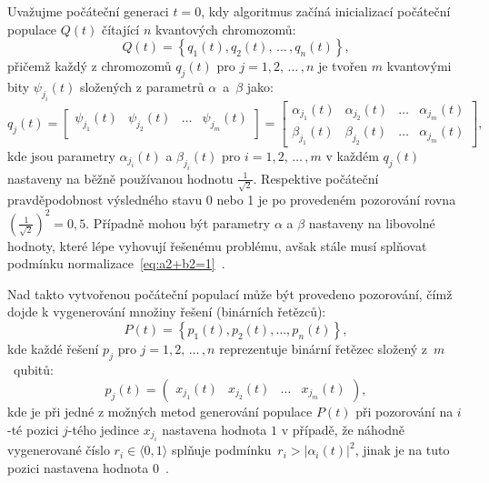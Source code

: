 Uvažujme počáteční generaci $t=0$, kdy algoritmus začíná inicializací počáteční populace $Q(t)$ čítající $n$ kvantových chromozomů:
\begin{equation}\label{eq:q(t)}
    Q(t) = \left\{ q_1(t), q_2(t),\,\dots\,, q_n(t) \right\},
\end{equation}
přičemž každý z chromozomů $q_j(t)$ pro $j = 1,2,\,\dots\,,n$ je tvořen $m$ kvantovými bity $\psi_{j_i}\left(t\right)$ složených z parametrů $\alpha$~a~$\beta$ jako:
\begin{equation*}
    q_j(t) =
    \begin{bmatrix}
        \psi_{j_1}\left(t\right) & \psi_{j_2}\left(t\right) & \dots & \psi_{j_m}\left(t\right) \\
    \end{bmatrix}
    =
    \begin{bmatrix}
        \alpha_{j_1}\left(t\right) & \alpha_{j_2}\left(t\right) & \dots & \alpha_{j_m}\left(t\right) \\
        \beta_{j_1}\left(t\right)  & \beta_{j_2}\left(t\right)  & \dots & \alpha_{j_m}\left(t\right)
    \end{bmatrix},
\end{equation*}
kde jsou parametry $\alpha_{j_i}(t)$ a $\beta_{j_i}(t)$ pro $i = 1,2,\,\dots\,,m$ v každém $q_j(t)$ nastaveny na běžně používanou hodnotu $\frac{1}{\sqrt{2}}$. 
Respektive počáteční pravděpodobnost výsledného stavu 0 nebo 1 je po provedeném pozorování rovna $\left(\frac{1}{\sqrt{2}}\right)^2 = 0,5$. 
Případně mohou být parametry $\alpha$ a $\beta$ nastaveny na libovolné hodnoty, které lépe vyhovují řešenému problému, avšak stále musí splňovat podmínku normalizace~\ref{eq:a2+b2=1}~\cite{NaturalComputing,qiga}. 

Nad takto vytvořenou počáteční populací může být provedeno pozorování, čímž dojde k vygenerování množiny řešení (binárních řetězců):
\begin{equation}\label{eq:p(t)}
    P(t) = \left\{ p_1(t), p_2(t), \dots, p_n(t) \right\},
\end{equation}
kde každé řešení $p_j$ pro $j = 1, 2,\,\dots\,, n$ reprezentuje binární řetězec složený z~$m$~qubitů:
\begin{equation*}
    p_j(t) = 
    \begin{pmatrix}
        x_{j_1}(t) & x_{j_2}(t) & \dots & x_{j_m}(t)
    \end{pmatrix},
\end{equation*}
kde je při jedné z možných metod generování populace $P(t)$ při pozorování na $i$-té pozici $j$-tého jedince $x_{j_{i}}$ nastavena hodnota $1$ v případě, že náhodně vygenerované číslo $r_i \in \langle 0, 1\rangle$ splňuje podmínku~$r_i > \left| \alpha_i(t) \right|^2$, jinak je na tuto pozici nastavena hodnota $0$~\cite{NaturalComputing,qiga}.

